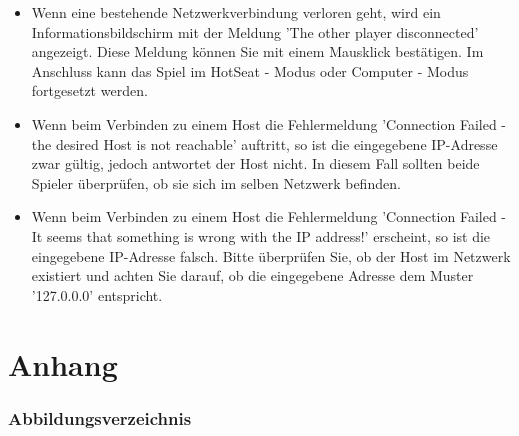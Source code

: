 \documentclass[12pt,a4paper]{article}
\begin{document}
\begin{itemize}
 
\item{Wenn eine bestehende Netzwerkverbindung verloren geht, wird ein Informationsbildschirm mit der Meldung 'The other player disconnected' angezeigt. Diese Meldung können Sie mit einem Mausklick bestätigen. Im Anschluss kann das Spiel im HotSeat - Modus oder Computer - Modus fortgesetzt werden.} 

\item{Wenn beim Verbinden zu einem Host die Fehlermeldung 'Connection Failed - the desired Host is not reachable' auftritt, so ist die eingegebene IP-Adresse zwar gültig, jedoch antwortet der Host nicht. In diesem Fall sollten beide Spieler überprüfen, ob sie sich im selben Netzwerk befinden.}

\item{Wenn beim Verbinden zu einem Host die Fehlermeldung 'Connection Failed - It seems that something is wrong with the IP address!' erscheint, so ist die eingegebene IP-Adresse falsch. Bitte überprüfen Sie, ob der Host im Netzwerk existiert und achten Sie darauf, ob die eingegebene Adresse dem Muster '127.0.0.0' entspricht.} 
 
\end{itemize}








\clearpage\vfill\newpage{}
\renewcommand{\thepage}{\Roman{page}}%
\setcounter{page}{1}

\setcounter{section}{2000}
\renewcommand\thesection{I}
\renewcommand\thesubsection{\thesection.\Roman{subsection}}
\renewcommand\thesubsubsection{\thesubsection.\Roman{subsubsection}}

	\part*{\sc Anhang}
\section{Abbildungsverzeichnis}\noindent%
\begingroup
\renewcommand{\section}[2]{}
	\listoffigures
\endgroup
\end{document}
